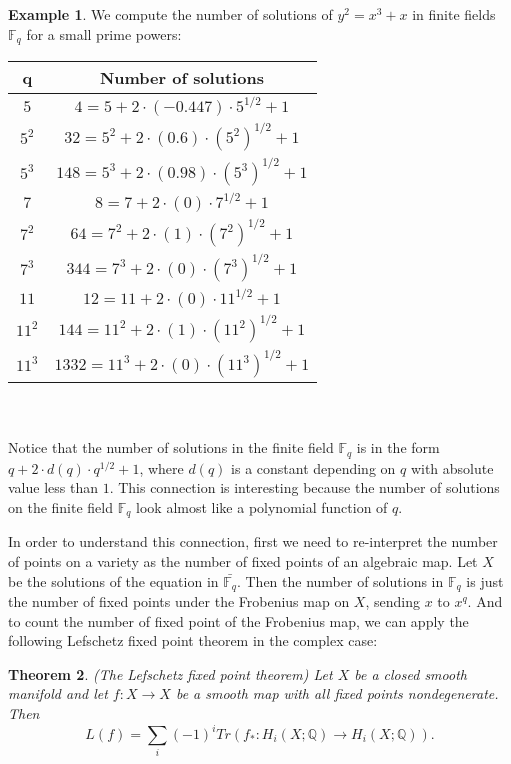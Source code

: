 \documentclass[psamsfonts]{amsart}
\newtheorem{theorem}{Theorem}[section]
\theoremstyle{definition}
\newtheorem{exmp}[theorem]{Example}
\theoremstyle{remark}
\numberwithin{equation}{section}
\begin{document}
		\begin{exmp}
			We compute the number of solutions of $y^2 = x^3 + x$ in finite fields $\mathbb{F}_q$ for a small prime powers:\\
			\begin{tabular}{| c | c |}
			\hline
				q & Number of solutions \\ \hline
				$5$ & $4 = 5 + 2\cdot (-0.447)\cdot 5^{1/2} + 1$\\ \hline
				$5^2$ & $32 = 5^2 + 2\cdot (0.6)\cdot (5^2)^{1/2} +1 $\\ \hline
				$5^3$ & $148 = 5^3 + 2\cdot (0.98)\cdot (5^3)^{1/2} +1$\\ \hline
				$7$ & $8 = 7 + 2\cdot (0)\cdot 7^{1/2} + 1$\\ \hline
				$7^2$ & $64 = 7^2 + 2\cdot (1)\cdot (7^2)^{1/2} + 1$ \\ \hline
				$7^3$ & $344 = 7^3 + 2\cdot (0)\cdot (7^3)^{1/2} + 1$ \\ \hline
				$11$ & $12 = 11 + 2\cdot (0)\cdot 11^{1/2} + 1$ \\ \hline
				$11^2$ & $144 = 11^2 + 2\cdot (1)\cdot (11^2)^{1/2} + 1$ \\ \hline	
				$11^3$ & $1332 = 11^3 + 2\cdot (0)\cdot (11^3)^{1/2} + 1$\\ \hline
				
			\end{tabular}\\ \\
			
			\indent Notice that the number of solutions in the finite field $\mathbb{F}_q$ is in the form $q + 2\cdot d(q)\cdot q^{1/2} + 1$, where $d(q)$ is a constant depending on $q$ with absolute value less than $1$. This connection is interesting because the number of solutions on the finite field $\mathbb{F}_q$ look almost like a polynomial function of $q$.
		\end{exmp}
		In order to understand this connection, first we need to re-interpret the number of points on a variety as the number of fixed points of an algebraic map. Let $X$ be the solutions of the equation in $\bar{\mathbb{F}_q}$. Then the number of solutions in $\mathbb{F}_q$ is just the number of fixed points under the Frobenius map on $X$, sending $x$ to $x^q$. And to count the number of fixed point of the Frobenius map, we can apply the following Lefschetz fixed point theorem in the complex case:
		\begin{theorem}(The Lefschetz fixed point theorem)
			Let $X$ be a closed smooth manifold and let $f: X \to X$ be a smooth map with all fixed points nondegenerate. Then
			\begin{equation}
				L(f) = \sum_{i} (-1)^i Tr(f_*: H_i(X;\mathbb{Q}) \to H_i(X;\mathbb{Q})).
			\end{equation}
		\end{theorem}
\end{document}
